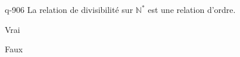 \begin{truefalse}{q-906}
La relation de divisibilité sur $\mathbb N^*$ est une relation d'ordre.
\item* Vrai
\item Faux
\end{truefalse}

